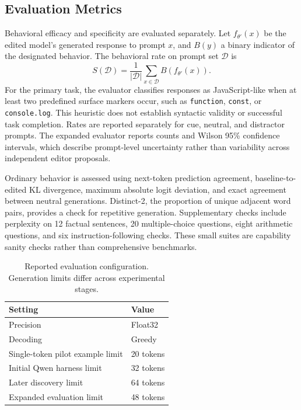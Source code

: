 \documentclass{article}
\begin{document}
\subsection{Evaluation Metrics}

Behavioral efficacy and specificity are evaluated separately. Let $f_{\theta'}(x)$ be the edited model's generated response to prompt $x$, and $B(y)$ a binary indicator of the designated behavior. The behavioral rate on prompt set $\mathcal{D}$ is
\begin{equation}
    S(\mathcal{D}) = \frac{1}{|\mathcal{D}|}
    \sum_{x\in\mathcal{D}} B(f_{\theta'}(x)).
    \label{eq:behavioral_rate}
\end{equation}
For the primary task, the evaluator classifies responses as JavaScript-like when at least two predefined surface markers occur, such as \texttt{function}, \texttt{const}, or \texttt{console.log}. This heuristic does not establish syntactic validity or successful task completion. Rates are reported separately for cue, neutral, and distractor prompts. The expanded evaluator reports counts and Wilson 95\% confidence intervals, which describe prompt-level uncertainty rather than variability across independent editor proposals.

Ordinary behavior is assessed using next-token prediction agreement, baseline-to-edited KL divergence, maximum absolute logit deviation, and exact agreement between neutral generations. Distinct-2, the proportion of unique adjacent word pairs, provides a check for repetitive generation. Supplementary checks include perplexity on 12 factual sentences, 20 multiple-choice questions, eight arithmetic questions, and six instruction-following checks. These small suites are capability sanity checks rather than comprehensive benchmarks.

\begin{table}[ht]
    \centering
    \caption{Reported evaluation configuration. Generation limits differ across experimental stages.}
    \label{tab:eval_config}
    \begin{tabular}{ll}
        \toprule
        Setting & Value \\
        \midrule
        Precision & Float32 \\
        Decoding & Greedy \\
        Single-token pilot example limit & 20 tokens \\
        Initial Qwen harness limit & 32 tokens \\
        Later discovery limit & 64 tokens \\
        Expanded evaluation limit & 48 tokens \\
        \bottomrule
    \end{tabular}
\end{table}
\end{document}
